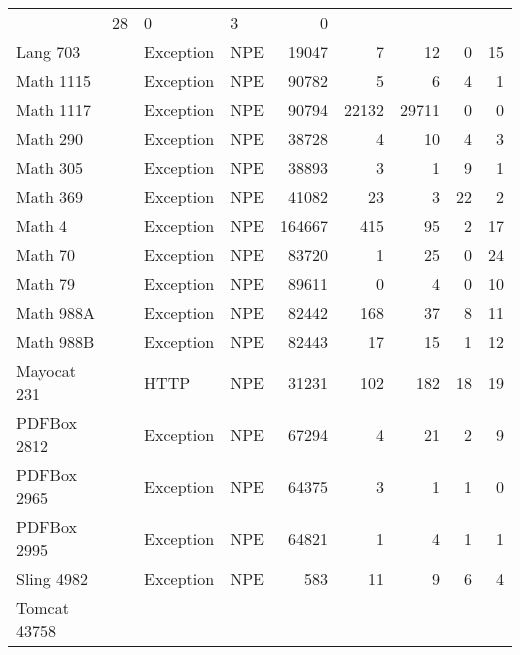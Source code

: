 \begin{table*}
\begin{tabular}{|l|l|l|l|r||r|r|r|r|}
    & 28 
    & 0 
    &  3   
    &  0 \\
    Lang 703 & \cite{npefix} 
    & Exception
    & NPE 
    & 19047 
    & 7 
    & 12 
    &  0   
    &  15 \\
    Math 1115 & \cite{npefix} 
    & Exception
    & NPE 
    & 90782 
    & 5 
    & 6 
    &  4   
    &  1 \\
    Math 1117 & \cite{npefix} 
    & Exception
    & NPE 
    & 90794 
    & 22132 
    & 29711 
    &  0   
    &  0 \\
    Math 290 & \cite{npefix} 
    & Exception
    & NPE 
    & 38728 
    & 4 
    & 10 
    &  4   
    &  3 \\
    Math 305 & \cite{npefix} 
    & Exception
    & NPE 
    & 38893 
    & 3 
    & 1 
    &  9   
    &  1 \\
    Math 369 & \cite{npefix} 
    & Exception
    & NPE 
    & 41082 
    & 23 
    & 3 
    &  22   
    &  2 \\
    Math 4 & \cite{JustJE2014} 
    & Exception
    & NPE 
    & 164667 
    & 415 
    & 95 
    &  2   
    &  17 \\
    Math 70 & \cite{JustJE2014} 
    & Exception
    & NPE 
    & 83720 
    & 1 
    & 25 
    &  0   
    &  24 \\
    Math 79 & \cite{JustJE2014} 
    & Exception
    & NPE 
    & 89611 
    & 0 
    & 4 
    &  0   
    &  10 \\
    Math 988A & \cite{npefix} 
    & Exception
    & NPE 
    & 82442 
    & 168 
    & 37 
    &  8   
    &  11 \\
    Math 988B & \cite{npefix} 
    & Exception
    & NPE 
    & 82443 
    & 17 
    & 15 
    &  1   
    &  12 \\
    Mayocat 231 & \cite{DurieuxHM16} 
    & HTTP
    & NPE 
    & 31231 
    & 102 
    & 182 
    &  18   
    &  19 \\
    PDFBox 2812 & \cite{npefix} 
    & Exception
    & NPE 
    & 67294 
    & 4 
    & 21 
    &  2   
    &  9 \\
    PDFBox 2965 & \cite{npefix} 
    & Exception
    & NPE 
    & 64375 
    & 3 
    & 1 
    &  1   
    &  0 \\
    PDFBox 2995 & \cite{npefix} 
    & Exception
    & NPE 
    & 64821 
    & 1 
    & 4 
    &  1   
    &  1 \\
    Sling 4982 & \cite{npefix} 
    & Exception
    & NPE 
    & 583 
    & 11 
    & 9 
    &  6   
    &  4 \\
    Tomcat 43758 & \cite{gu2016automatic} 

\end{tabular}
\end{table*}
